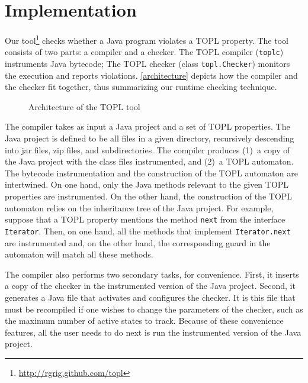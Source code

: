 \documentclass[10pt, preprint]{sigplanconf} %
\begin{document}

\section{Implementation} \label{sec:implementation} %

Our tool\footnote{\url{http://rgrig.github.com/topl}} checks whether a Java program violates a TOPL property.
The tool consists of two parts: a compiler and a checker.
The TOPL compiler ({\tt toplc}) instruments Java bytecode;
The TOPL checker (class {\tt topl.Checker}) monitors the execution and reports violations.
\autoref{architecture} depicts how the compiler and the checker fit together, thus summarizing our runtime checking technique.

\begin{figure*}[t]
\begin{center}

\caption{Architecture of the TOPL tool}
\label{architecture}
\end{center}
\end{figure*}

The compiler takes as input a Java project and a set of TOPL properties.
The Java project is defined to be all files in a given directory, recursively descending into jar files, zip files, and subdirectories.
The compiler produces (1)~a copy of the Java project with the class files instrumented, and (2)~a TOPL automaton.
The bytecode instrumentation and the construction of the TOPL automaton are intertwined.
On one hand, only the Java methods relevant to the given TOPL properties are instrumented.
On the other hand, the construction of the TOPL automaton relies on the inheritance tree of the Java project.
For example, suppose that a TOPL property mentions the method {\tt next} from the interface {\tt Iterator}.
Then, on one hand, all the methods that implement {\tt Iterator.next} are instrumented and, on the other hand, the corresponding guard in the automaton will match all these methods.

The compiler also performs two secondary tasks, for convenience.
First, it inserts a copy of the checker in the instrumented version of the Java project.
Second, it generates a Java file that activates and configures the checker.
It is this file that must be recompiled if one wishes to change the parameters of the checker, such as the maximum number of active states to track.
Because of these convenience features, all the user needs to do next is run the instrumented version of the Java project.
\end{document}
